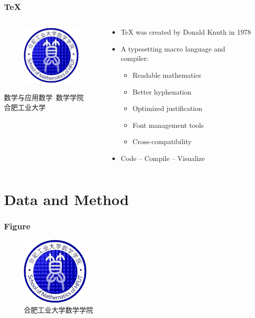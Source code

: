 \documentclass[aspectratio=169]{beamer}
\begin{document}
\begin{frame}
\frametitle{\TeX{}}
\begin{columns}
\begin{column}{4cm}
	\begin{figure}
		\includegraphics[height=3cm]{logo-background-sxxy.png}
	\end{figure}
	\begin{center}
		\tiny
		数学与应用数学\
		数学学院\\
		合肥工业大学 \\
	\end{center}
\end{column}
\begin{column}{6cm}
	\hspace{-1.0cm}
	\begin{itemize}
		\item \TeX{} was created by Donald Knuth in 1978
		\item A typesetting macro language and compiler:
		\begin{itemize}
			\item Readable mathematics
			\item Better hyphenation
			\item Optimized justification
			\item Font management tools
			\item Cross-compatibility
		\end{itemize}
		\item Code -- Compile -- Visualize
	\end{itemize}
\end{column}
\end{columns}
\end{frame}



\section{Data and Method}

\begin{frame}
\frametitle{Figure}
\vspace{-0.3cm}
\begin{figure}[h]
\centering
\includegraphics[width=0.3\textwidth]{logo-background-sxxy.png}
\caption{合肥工业大学数学学院}
\end{figure}
\end{frame}
\end{document}
